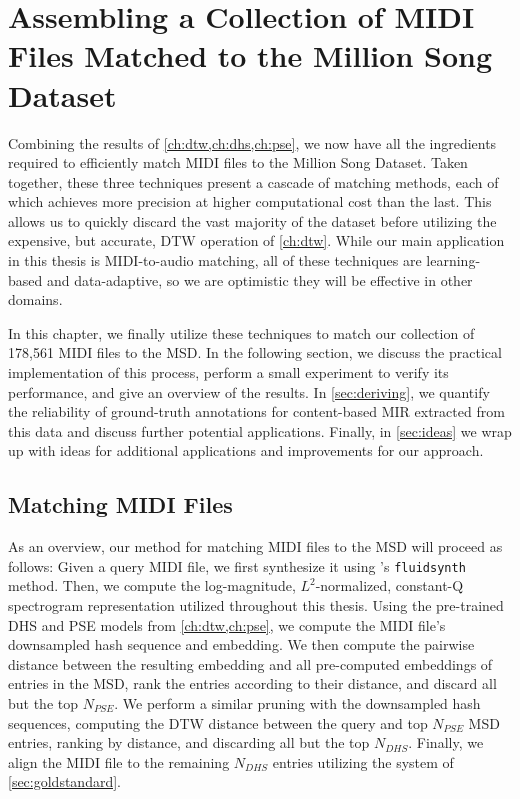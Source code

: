 \chapter{Assembling a Collection of MIDI Files Matched to the Million Song Dataset}
\label{ch:assembling}

Combining the results of \cref{ch:dtw,ch:dhs,ch:pse}, we now have all the ingredients required to efficiently match MIDI files to the Million Song Dataset.
Taken together, these three techniques present a cascade of matching methods, each of which achieves more precision at higher computational cost than the last.
This allows us to quickly discard the vast majority of the dataset before utilizing the expensive, but accurate, DTW operation of \cref{ch:dtw}.
While our main application in this thesis is MIDI-to-audio matching, all of these techniques are learning-based and data-adaptive, so we are optimistic they will be effective in other domains.

In this chapter, we finally utilize these techniques to match our collection of 178,561 MIDI files to the MSD.
In the following section, we discuss the practical implementation of this process, perform a small experiment to verify its performance, and give an overview of the results.
In \cref{sec:deriving}, we quantify the reliability of ground-truth annotations for content-based MIR extracted from this data and discuss further potential applications.
Finally, in \cref{sec:ideas} we wrap up with ideas for additional applications and improvements for our approach.

\section{Matching MIDI Files}

As an overview, our method for matching MIDI files to the MSD will proceed as follows:
Given a query MIDI file, we first synthesize it using \prettymidi{}'s \texttt{fluidsynth} method.
Then, we compute the log-magnitude, $L^2$-normalized, constant-Q spectrogram representation utilized throughout this thesis.
Using the pre-trained DHS and PSE models from \cref{ch:dtw,ch:pse}, we compute the MIDI file's downsampled hash sequence and embedding.
We then compute the pairwise distance between the resulting embedding and all pre-computed embeddings of entries in the MSD, rank the entries according to their distance, and discard all but the top $N_{PSE}$.
We perform a similar pruning with the downsampled hash sequences, computing the DTW distance between the query and top $N_{PSE}$ MSD entries, ranking by distance, and discarding all but the top $N_{DHS}$.
Finally, we align the MIDI file to the remaining $N_{DHS}$ entries utilizing the system of \cref{sec:goldstandard}.

